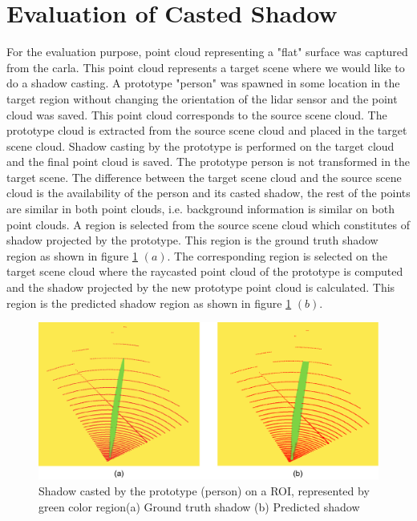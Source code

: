 \section{Evaluation of Casted Shadow}
For the evaluation purpose, point cloud representing a "flat" surface was captured from the \acrshort{carla}. This point cloud represents a target scene where we would like to do a shadow casting. A prototype "person" was spawned in some location in the target region without changing the orientation of the lidar sensor and the point cloud was saved. This point cloud corresponds to the source scene cloud. The prototype cloud is extracted from the source scene cloud and placed in the target scene cloud. Shadow casting by the prototype is performed on the target cloud and the final point cloud is saved. The prototype person is not transformed in the target scene. The difference between the target scene cloud and the source scene cloud is the availability of the person and its casted shadow, the rest of the points are similar in both point clouds, i.e. background information is similar on both point clouds. A region is selected from the source scene cloud which constitutes of shadow projected by the prototype. This region is the ground truth shadow region as shown in figure \ref{fig:evaluation-shadow_difference_roi} \((a)\). The corresponding region is selected on the target scene cloud where the raycasted point cloud of the prototype is computed and the shadow projected by the new prototype point cloud is calculated. This region is the predicted shadow region as shown in figure \ref{fig:evaluation-shadow_difference_roi} \((b)\).
\begin{figure}[htbp]
    \centering
    \includegraphics[width=1\linewidth]{97_graphics//evaluation/shadow_difference_roi.pdf}
    \caption[Shadow casted by the prototype]{Shadow casted by the prototype (person) on a ROI, represented by green color region(a) Ground truth shadow (b) Predicted shadow}
    \label{fig:evaluation-shadow_difference_roi}
\end{figure}

